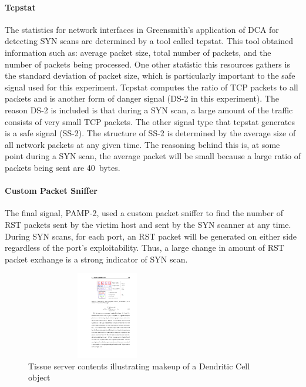 \documentclass{umm-senior-sem}
\begin{document}
\paragraph{Tcpstat}
The statistics for network interfaces in Greensmith's application of DCA for detecting SYN scans are determined by a tool called tcpstat. This tool obtained information such as: average packet size, total number of packets, and the number of packets being processed. One other statistic this resources gathers is the standard deviation of packet size, which is particularly important to the safe signal used for this experiment.
Tcpstat computes the ratio of TCP packets to all packets and is another form of danger signal (DS-2 in this experiment). The reason DS-2 is included is that during a SYN scan, a large amount of the traffic consists of very small TCP packets.
The other signal type that tcpstat generates is a safe signal (SS-2). The structure of SS-2 is determined by the average size of all network packets at any given time. The reasoning behind this is, at some point during a SYN scan, the average packet will be small because a large ratio of packets being sent are 40~bytes.
\paragraph{Custom Packet Sniffer}
The final signal, PAMP-2, used a custom packet sniffer to find the number of RST packets sent by the victim host and sent by the SYN scanner at any time. 
During SYN scans, for each port, an RST packet will be generated on either side regardless of the port's exploitability. Thus, a large change in amount of RST packet exchange is a strong indicator of SYN scan.

\begin{figure}
\includegraphics[width = 2.8in, height = 1.5in]{images/dcObject.pdf}
\caption{Tissue server contents illustrating makeup of a Dendritic Cell object~\cite{greensmith_thesis:2007}}
\label{fig:dcObject}
\end{figure}
\end{document}
